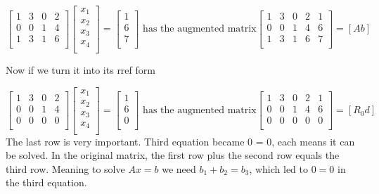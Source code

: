 \[
    \begin{bmatrix}
        1 & 3 & 0 & 2  \\
        0 & 0 & 1 & 4  \\
        1 & 3 & 1 & 6  \\
    \end{bmatrix}
    \begin{bmatrix}
         x_1 \\
        x_2  \\
        x_3  \\
        x_4  \\
    \end{bmatrix}
    = 
    \begin{bmatrix}
         1 \\
         6 \\
         7 \\
    \end{bmatrix}
    \text{ has the augmented matrix}
    \begin{bmatrix}
        1 & 3 & 0 & 2  & 1  \\
        0 & 0 & 1 & 4 & 6  \\
        1 & 3 & 1 & 6 & 7  \\
    \end{bmatrix}
    = [A b]
\]

Now if we turn it into its rref form 

\[
    \begin{bmatrix}
        1 & 3 & 0 & 2  \\
        0 & 0 & 1 & 4  \\
        0 & 0 & 0 & 0  \\
    \end{bmatrix}
    \begin{bmatrix}
         x_1 \\
        x_2  \\
        x_3  \\
        x_4  \\
    \end{bmatrix}
    = 
    \begin{bmatrix}
         1 \\
         6 \\
         0 \\
    \end{bmatrix}
    \text{ has the augmented matrix}
    \begin{bmatrix}
        1 & 3 & 0 & 2  & 1  \\
        0 & 0 & 1 & 4 & 6  \\
        0 & 0 & 0 & 0 & 0  \\
    \end{bmatrix}
    = [R_0 d]
\]
The last row is very important. Third equation became 0 = 0, each means it can be solved. In the original matrix, the first row plus the second row equals the third row. Meaning to solve \(Ax = b\) we need \(b_1 + b_2 = b_3\), which led to \(0 = 0\) in the third equation. 


